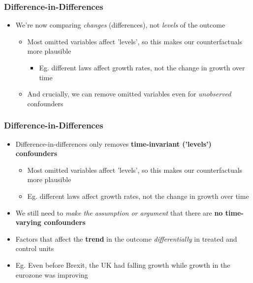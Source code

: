 \documentclass[xcolor=x11names,compress]{beamer}\usepackage[]{graphicx}\usepackage[]{color}
\renewcommand{\(}{\begin{columns}}
\renewcommand{\)}{\end{columns}}
\newcommand{\<}[1]{\begin{column}{#1}}
\renewcommand{\>}{\end{column}}
\begin{document}
\begin{frame}
\frametitle{Difference-in-Differences}
\begin{itemize}
\item We're now comparing \textit{changes} (differences), not \textit{levels} of the outcome
\begin{itemize}
\item Most omitted variables affect 'levels', so this makes our counterfactuals more plausible
\begin{itemize}
\item Eg. different laws affect growth rates, not the change in growth over time
\end{itemize}
\item And crucially, we can remove omitted variables even for \textit{unobserved} confounders
\end{itemize}
\end{itemize}
\end{frame}

\begin{frame}
\frametitle{Difference-in-Differences}
\begin{itemize}
\item Difference-in-differences only removes \textbf{time-invariant ('levels') confounders}
\pause
\begin{itemize}
\item Most omitted variables affect 'levels', so this makes our counterfactuals more plausible
\pause
\item Eg. different laws affect growth rates, not the change in growth over time
\pause
\end{itemize}
\item We still need to \textit{make the assumption or argument} that there are \textbf{no time-varying confounders}
\pause
\item Factors that affect the \textbf{trend} in the outcome \textit{differentially} in treated and control units
\pause
\item Eg. Even before Brexit, the UK had falling growth while growth in the eurozone was improving
\end{itemize}
\end{frame}
\end{document}
